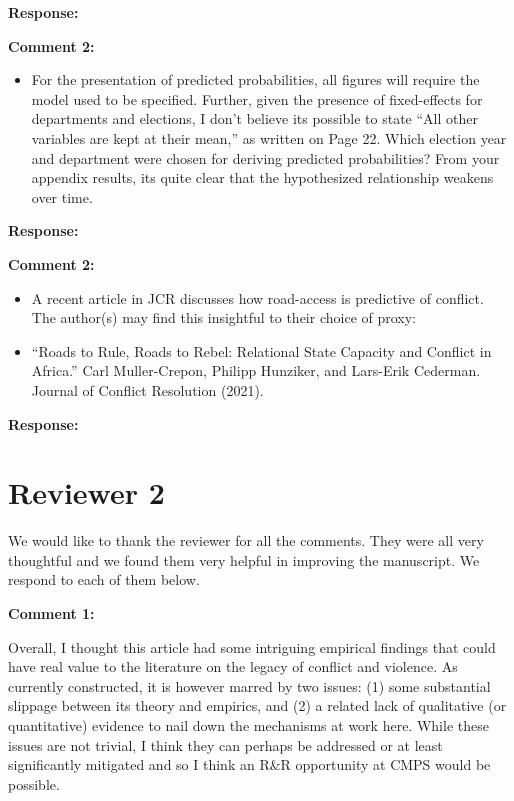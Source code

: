 \documentclass[12pt, a4paper, notitlepage]{article}
\begin{document}
\noindent\textbf{Response:}

\vspace{15pt}
\noindent\textbf{Comment 2:}
\begin{displayquote}
\begin{itemize}
\item For the presentation of predicted probabilities, all figures will require the model used to be specified. Further, given the presence of fixed-effects for departments and elections, I don’t believe its possible to state “All other variables are kept at their mean,” as written on Page 22. Which election year and department were chosen for deriving predicted probabilities? From your appendix results, its quite clear that the hypothesized relationship weakens over time.
\end{itemize}
\end{displayquote}

\noindent\textbf{Response:}

\vspace{15pt}
\noindent\textbf{Comment 2:}
\begin{displayquote}
\begin{itemize}
\item A recent article in JCR discusses how road-access is predictive of conflict. The author(s) may find this insightful to their choice of proxy:
\item[] ``Roads to Rule, Roads to Rebel: Relational State Capacity and Conflict in Africa.'' Carl Muller-Crepon, Philipp Hunziker, and Lars-Erik Cederman. Journal of Conflict Resolution (2021).
\end{itemize}
\end{displayquote}

\noindent\textbf{Response:}

\newpage
\section*{Reviewer 2}

\textbf{{\color{red}{CHANGE }}} We would like to thank the reviewer for all the comments. They were all very thoughtful and we found them very helpful in improving the manuscript. We respond to each of them below.

\vspace{15pt}
\noindent\textbf{Comment 1:}
\begin{displayquote}
Overall, I thought this article had some intriguing empirical findings that could have real value to the literature on the legacy of conflict and violence. As currently constructed, it is however marred by two issues: (1) some substantial slippage between its theory and empirics, and (2) a related lack of qualitative (or quantitative) evidence to nail down the mechanisms at work here. While these issues are not trivial, I think they can perhaps be addressed or at least significantly mitigated and so I think an R&R opportunity at CMPS would be possible.
\end{displayquote}
\end{document}
